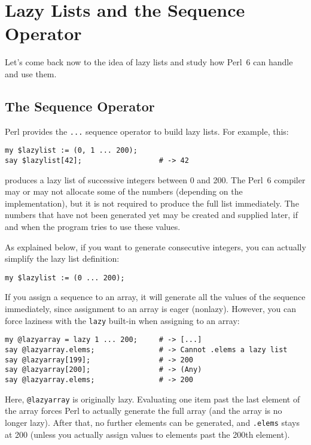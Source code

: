 \section{Lazy Lists and the Sequence Operator}

Let's come back now to the idea of lazy lists and study 
how Perl~6 can handle and use them.

\subsection{The Sequence Operator}

Perl provides the \verb'...' sequence operator to build 
lazy lists. For example, this:

\begin{verbatim}
my $lazylist := (0, 1 ... 200);
say $lazylist[42];                  # -> 42
\end{verbatim}

produces a lazy list of successive integers between 0 and 200. 
The Perl~6 compiler may or may not allocate some of the numbers
(depending on the implementation), but it is not required to 
produce the full list immediately. The numbers that have not 
been generated yet may be created and supplied later, if and when 
the program tries to use these values. 

As explained below, if you want to generate consecutive 
integers, you can actually simplify the lazy list definition:

\begin{verbatim}
my $lazylist := (0 ... 200);
\end{verbatim}


If you assign a sequence to an array, it will generate 
all the values of the sequence immediately, since 
assignment to an array is eager (nonlazy).  However, 
you can force laziness with the  {\tt lazy} built-in 
when assigning to an array:

\begin{verbatim}
my @lazyarray = lazy 1 ... 200;     # -> [...]
say @lazyarray.elems;               # -> Cannot .elems a lazy list
say @lazyarray[199];                # -> 200
say @lazyarray[200];                # -> (Any)
say @lazyarray.elems;               # -> 200
\end{verbatim}

Here, \verb'@lazyarray' is originally lazy. 
Evaluating one item past the last element of the array 
forces Perl to actually generate the full array (and the 
array is no longer lazy). After that, no further elements 
can be generated, and {\tt .elems} stays at 200 (unless 
you actually assign values to elements past the 200th 
element).

